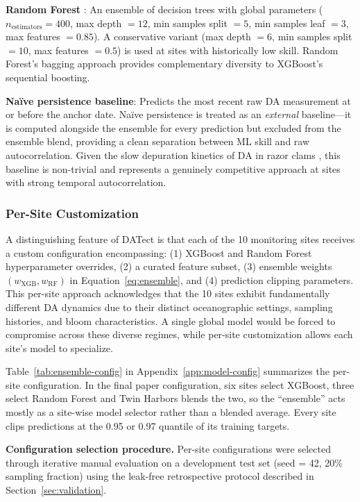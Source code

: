 \documentclass[toxins,article,submit,moreauthors]{Definitions/mdpi}
\begin{document}
\textbf{Random Forest} \cite{Breiman2001}: An ensemble of decision trees with global parameters ($n_{\text{estimators}} = 400$, max depth $= 12$, min samples split $= 5$, min samples leaf $= 3$, max features $= 0.85$). A conservative variant (max depth $= 6$, min samples split $= 10$, max features $= 0.5$) is used at sites with historically low skill. Random Forest's bagging approach provides complementary diversity to XGBoost's sequential boosting.

\textbf{Na\"ive persistence baseline}: Predicts the most recent raw DA measurement at or before the anchor date. Na\"ive persistence is treated as an \textit{external} baseline---it is computed alongside the ensemble for every prediction but excluded from the ensemble blend, providing a clean separation between ML skill and raw autocorrelation. Given the slow depuration kinetics of DA in razor clams \cite{Drum1993}, this baseline is non-trivial and represents a genuinely competitive approach at sites with strong temporal autocorrelation.

\subsubsection{Per-Site Customization}

A distinguishing feature of DATect is that each of the 10 monitoring sites receives a custom configuration encompassing: (1) XGBoost and Random Forest hyperparameter overrides, (2) a curated feature subset, (3) ensemble weights $(w_{\text{XGB}}, w_{\text{RF}})$ in Equation~\eqref{eq:ensemble}, and (4) prediction clipping parameters. This per-site approach acknowledges that the 10 sites exhibit fundamentally different DA dynamics due to their distinct oceanographic settings, sampling histories, and bloom characteristics. A single global model would be forced to compromise across these diverse regimes, while per-site customization allows each site's model to specialize.

Table~\ref{tab:ensemble-config} in Appendix~\ref{app:model-config} summarizes the per-site configuration. In the final paper configuration, six sites select XGBoost, three select Random Forest and Twin Harbors blends the two, so the ``ensemble'' acts mostly as a site-wise model selector rather than a blended average. Every site clips predictions at the 0.95 or 0.97 quantile of its training targets.

\textbf{Configuration selection procedure.} Per-site configurations were selected through iterative manual evaluation on a development test set (seed = 42, 20\% sampling fraction) using the leak-free retrospective protocol described in Section~\ref{sec:validation}.
\end{document}

